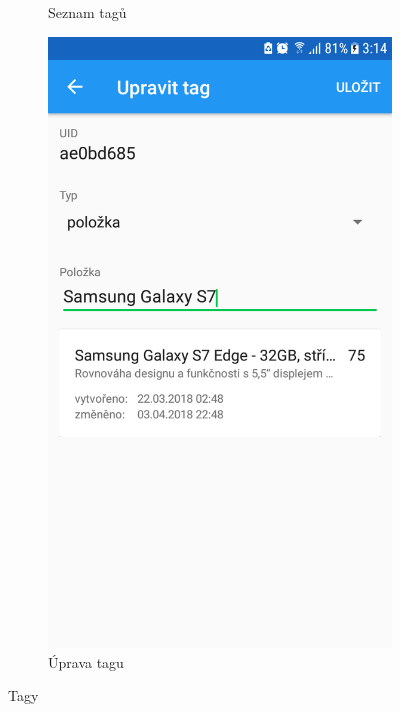 \documentclass[12pt]{report}
\begin{document}
\begin{figure}[H]
\begin{subfigure}[b]{0.3\textwidth}
	\caption{Seznam tagů}
	\label{fig:Screenshot_20170607-164958}
  \end{subfigure}
  \begin{subfigure}[b]{0.3\textwidth}
    \centering
	\includegraphics[width=\textwidth]{../images/client_android/Screenshot_20180412-031459.png}	
	\caption{Úprava tagu}
	\label{fig:Screenshot_20180412-031459}
  \end{subfigure}
  \caption{Tagy}
\end{figure}
\end{document}
